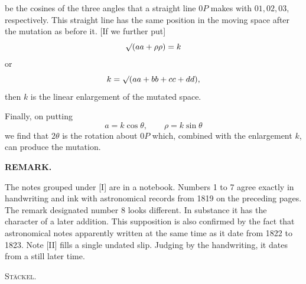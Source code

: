 %
\noindent be the cosines of the three angles that a straight line $0P$ makes with $01,02,03$, respectively. This straight line has the same position in the moving space after the mutation as before it. [If we further put]
\[
\mathord{\surd}(aa+\rho\rho)=k
\]
or
\[
k=\mathord{\surd}(aa+bb+cc+dd),
\]
then $k$ is the linear enlargement of the mutated space.

Finally, on putting
\[
a=k\cos\theta,\qquad \rho=k\sin\theta
\]
we find that $2\theta$ is the rotation about $0P$ which, combined with the enlargement $k$, can produce the mutation.

\begin{center}\bfseries REMARK.\end{center}

The notes grouped under [I] are in a notebook. Numbers 1 to 7 agree exactly in handwriting and ink with astronomical records from 1819 on the preceding pages. The remark designated number 8 looks different. In substance it has the character of a later addition. This supposition is also confirmed by the fact that astronomical notes apparently written at the same time as it date from 1822 to 1823. Note [II] fills a single undated slip. Judging by the handwriting, it dates from a still later time.
\begin{flushright}\textsc{Stäckel.}\end{flushright}
